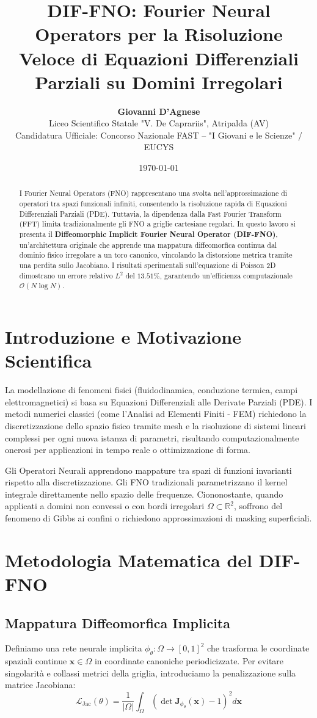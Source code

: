 \documentclass[11pt,a4paper]{article}
\title{\Large \textbf{DIF-FNO: Fourier Neural Operators per la Risoluzione Veloce di Equazioni Differenziali Parziali su Domini Irregolari}}
\author{\textbf{Giovanni D'Agnese}\\
Liceo Scientifico Statale "V. De Caprariis", Atripalda (AV)\\
\small Candidatura Ufficiale: Concorso Nazionale FAST -- "I Giovani e le Scienze" / EUCYS}
\date{\today}
\begin{document}
\maketitle

\begin{abstract}
I Fourier Neural Operators (FNO) rappresentano una svolta nell'approssimazione di operatori tra spazi funzionali infiniti, consentendo la risoluzione rapida di Equazioni Differenziali Parziali (PDE). Tuttavia, la dipendenza dalla Fast Fourier Transform (FFT) limita tradizionalmente gli FNO a griglie cartesiane regolari. In questo lavoro si presenta il \textbf{Diffeomorphic Implicit Fourier Neural Operator (DIF-FNO)}, un'architettura originale che apprende una mappatura diffeomorfica continua dal dominio fisico irregolare a un toro canonico, vincolando la distorsione metrica tramite una perdita sullo Jacobiano. I risultati sperimentali sull'equazione di Poisson 2D dimostrano un errore relativo $L^2$ del $13.51\%$, garantendo un'efficienza computazionale $\mathcal{O}(N \log N)$.
\end{abstract}

\section{Introduzione e Motivazione Scientifica}
La modellazione di fenomeni fisici (fluidodinamica, conduzione termica, campi elettromagnetici) si basa su Equazioni Differenziali alle Derivate Parziali (PDE). I metodi numerici classici (come l'Analisi ad Elementi Finiti - FEM) richiedono la discretizzazione dello spazio fisico tramite mesh e la risoluzione di sistemi lineari complessi per ogni nuova istanza di parametri, risultando computazionalmente onerosi per applicazioni in tempo reale o ottimizzazione di forma.

Gli Operatori Neurali apprendono mappature tra spazi di funzioni invarianti rispetto alla discretizzazione. Gli FNO tradizionali parametrizzano il kernel integrale direttamente nello spazio delle frequenze. Ciononostante, quando applicati a domini non convessi o con bordi irregolari $\Omega \subset \mathbb{R}^2$, soffrono del fenomeno di Gibbs ai confini o richiedono approssimazioni di masking superficiali.

\section{Metodologia Matematica del DIF-FNO}

\subsection{Mappatura Diffeomorfica Implicita}
Definiamo una rete neurale implicita $\phi_\theta: \Omega \to [0, 1]^2$ che trasforma le coordinate spaziali continue $\mathbf{x} \in \Omega$ in coordinate canoniche periodicizzate. Per evitare singolarità e collassi metrici della griglia, introduciamo la penalizzazione sulla matrice Jacobiana:
\begin{equation}
\mathcal{L}_{\text{Jac}}(\theta) = \frac{1}{|\Omega|} \int_{\Omega} \left( \det \mathbf{J}_{\phi_\theta}(\mathbf{x}) - 1 \right)^2 d\mathbf{x}
\end{equation}
\end{document}
